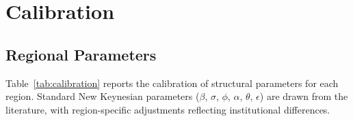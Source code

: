 \documentclass[12pt,a4paper]{article}
\begin{document}

\section{Calibration}
\label{sec:calibration}

\subsection{Regional Parameters}

Table~\ref{tab:calibration} reports the calibration of structural parameters for each region. Standard New Keynesian parameters ($\beta$, $\sigma$, $\phi$, $\alpha$, $\theta$, $\epsilon$) are drawn from the literature, with region-specific adjustments reflecting institutional differences.
\end{document}
